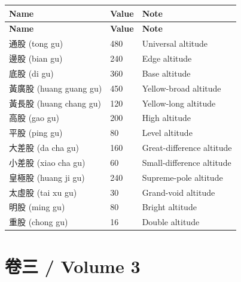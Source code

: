 \documentclass[11pt,a4paper]{article}
\begin{document}
\begin{center}
\begin{longtable}{|l|l|l|}
\hline
\textbf{Name} & \textbf{Value} & \textbf{Note} \\
\hline
\endfirsthead
\hline
\textbf{Name} & \textbf{Value} & \textbf{Note} \\
\hline
\endhead
通股 (tong gu) & 480 & Universal altitude \\
\hline
邊股 (bian gu) & 240 & Edge altitude \\
\hline
底股 (di gu) & 360 & Base altitude \\
\hline
黃廣股 (huang guang gu) & 450 & Yellow-broad altitude \\
\hline
黃長股 (huang chang gu) & 120 & Yellow-long altitude \\
\hline
高股 (gao gu) & 200 & High altitude \\
\hline
平股 (ping gu) & 80 & Level altitude \\
\hline
大差股 (da cha gu) & 160 & Great-difference altitude \\
\hline
小差股 (xiao cha gu) & 60 & Small-difference altitude \\
\hline
皇極股 (huang ji gu) & 240 & Supreme-pole altitude \\
\hline
太虛股 (tai xu gu) & 30 & Grand-void altitude \\
\hline
明股 (ming gu) & 80 & Bright altitude \\
\hline
重股 (chong gu) & 16 & Double altitude \\
\hline
\end{longtable}
\end{center}

\clearpage

\section{卷三 / Volume 3}
\end{document}
